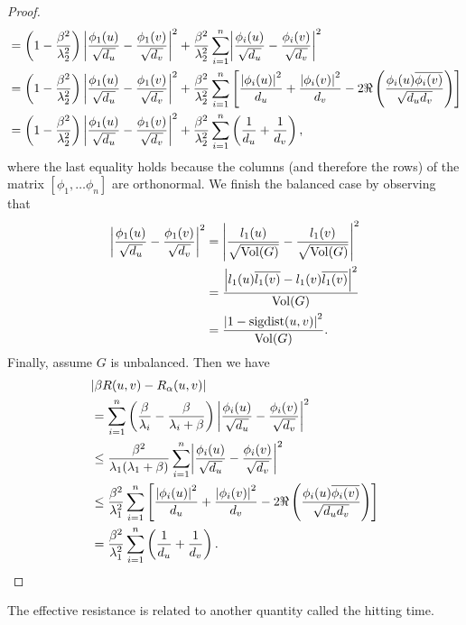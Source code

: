 \documentclass[12pt]{article}
\theoremstyle{definition}
\DeclarePairedDelimiter\abs{\lvert}{\rvert}
\DeclareMathOperator{\sigdist}{sigdist}
\DeclareMathOperator{\vol}{Vol}
\begin{document}
\begin{proof}
\begin{align*}
&= \left( 1 - \frac{\beta^2}{\lambda_2^2} \right) \abs*{\frac{\phi_1(u)}{\sqrt{d_u}} - \frac{\phi_1(v)}{\sqrt{d_v}}}^2 + \frac{\beta^2}{\lambda_2^2} \sum_{i=1}^n \abs*{\frac{\phi_i(u)}{\sqrt{d_u}} - \frac{\phi_i(v)}{\sqrt{d_v}}}^2 \\
&= \left( 1 - \frac{\beta^2}{\lambda_2^2} \right) \abs*{\frac{\phi_1(u)}{\sqrt{d_u}} - \frac{\phi_1(v)}{\sqrt{d_v}}}^2 + \frac{\beta^2}{\lambda_2^2} \sum_{i=1}^n \left[ \frac{\abs*{\phi_i(u)}^2}{d_u} + \frac{\abs*{\phi_i(v)}^2}{d_v} - 2 \Re \left( \frac{\phi_i(u) \overline{\phi_i(v)}}{\sqrt{d_u d_v}} \right) \right] \\
&= \left( 1 - \frac{\beta^2}{\lambda_2^2} \right) \abs*{\frac{\phi_1(u)}{\sqrt{d_u}} - \frac{\phi_1(v)}{\sqrt{d_v}}}^2 + \frac{\beta^2}{\lambda_2^2} \sum_{i=1}^n \left( \frac{1}{d_u} + \frac{1}{d_v} \right),
\end{align*}
where the last equality holds because the columns (and therefore the rows) of the matrix $[\phi_1, \dots \phi_n]$ are orthonormal. We finish the balanced case by observing that
\begin{align*}
\abs*{\frac{\phi_1(u)}{\sqrt{d_u}} - \frac{\phi_1(v)}{\sqrt{d_v}}}^2
&= \abs*{\frac{l_1(u)}{\sqrt{\vol(G)}} - \frac{l_1(v)}{\sqrt{\vol(G)}}}^2 \\
&= \frac{\abs*{l_1(u) \overline{l_1(v)} - l_1(v) \overline{l_1(v)}}^2}{\vol(G)} \\
&= \frac{\abs*{1 - \sigdist(u, v)}^2}{\vol(G)}.
\end{align*}
Finally, assume $G$ is unbalanced. Then we have
\begin{align*}
&\abs*{\beta R(u, v) - R_\alpha (u, v)} \\
&= \sum_{i=1}^n \left( \frac{\beta}{\lambda_i} - \frac{\beta}{\lambda_i + \beta} \right) \abs*{\frac{\phi_i(u)}{\sqrt{d_u}} - \frac{\phi_i(v)}{\sqrt{d_v}}}^2 \\
&\leq \frac{\beta^2}{\lambda_1(\lambda_1 + \beta)} \sum_{i=1}^n \abs*{\frac{\phi_i(u)}{\sqrt{d_u}} - \frac{\phi_i(v)}{\sqrt{d_v}}}^2 \\
&\leq \frac{\beta^2}{\lambda_1^2} \sum_{i=1}^n \left[ \frac{\abs*{\phi_i(u)}^2}{d_u} + \frac{\abs*{\phi_i(v)}^2}{d_v} - 2 \Re \left( \frac{\phi_i(u) \overline{\phi_i(v)}}{\sqrt{d_u d_v}} \right) \right] \\
&= \frac{\beta^2}{\lambda_1^2} \sum_{i=1}^n \left( \frac{1}{d_u} + \frac{1}{d_v} \right).
\end{align*}
\end{proof}

The effective resistance is related to another quantity called the hitting time.
\end{document}
